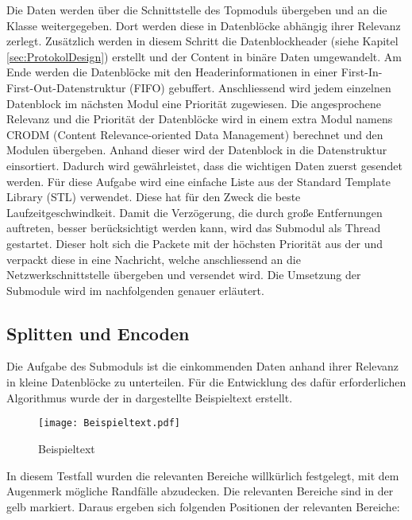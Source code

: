 Die Daten werden {\"u}ber die Schnittstelle des Topmoduls {\"u}bergeben und an die
Klasse  weitergegeben. Dort werden diese in Datenbl{\"o}cke
abh{\"a}ngig ihrer Relevanz zerlegt. Zus{\"a}tzlich werden in diesem Schritt die
Datenblockheader (siehe Kapitel \ref{sec:ProtokolDesign}) erstellt und der
Content in bin{\"a}re Daten umgewandelt. Am Ende werden die Datenbl{\"o}cke mit den
Headerinformationen in einer First-In-First-Out-Datenstruktur (FIFO)
gebuffert.
Anschliessend wird jedem einzelnen Datenblock im n{\"a}chsten Modul eine Priorit{\"a}t zugewiesen. Die angesprochene
Relevanz und die Priorit{\"a}t der Datenbl{\"o}cke wird in einem extra Modul namens
CRODM (Content Relevance-oriented Data Management)
berechnet und den Modulen {\"u}bergeben.
Anhand dieser wird der Datenblock in die Datenstruktur
 einsortiert. Dadurch wird
gew{\"a}hrleistet, dass die wichtigen Daten zuerst gesendet werden. F{\"u}r diese
Aufgabe wird eine einfache Liste aus der Standard Template Library (STL) verwendet.
Diese hat f{\"u}r den Zweck die beste Laufzeitgeschwindkeit.
Damit die Verz{\"o}gerung, die durch gro{\ss}e Entfernungen auftreten, besser
ber{\"u}cksichtigt werden kann, wird das Submodul  als Thread
gestartet.
Dieser holt sich die Packete mit der h{\"o}chsten Priorit{\"a}t aus der
 und verpackt diese in eine Nachricht, welche
anschliessend an die Netzwerkschnittstelle {\"u}bergeben und versendet wird. \newline
Die Umsetzung der Submodule wird im nachfolgenden genauer erl{\"a}utert.

\subsection{Splitten und Encoden}

Die Aufgabe des Submoduls  ist die einkommenden Daten
anhand ihrer Relevanz in kleine Datenbl{\"o}cke zu unterteilen. F{\"u}r die Entwicklung
des daf{\"u}r erforderlichen Algorithmus wurde der in 
dargestellte Beispieltext erstellt.

\begin{figure}[H]
\centering
\texttt{[image: Beispieltext.pdf]}
\caption{Beispieltext}
\label{fig:Beispieltext}
\end{figure}

In diesem Testfall wurden die relevanten Bereiche willk{\"u}rlich festgelegt, mit
dem Augenmerk m{\"o}gliche Randf{\"a}lle abzudecken. Die relevanten Bereiche sind in
der  gelb markiert.\newline
Daraus ergeben sich folgenden Positionen der relevanten Bereiche:

